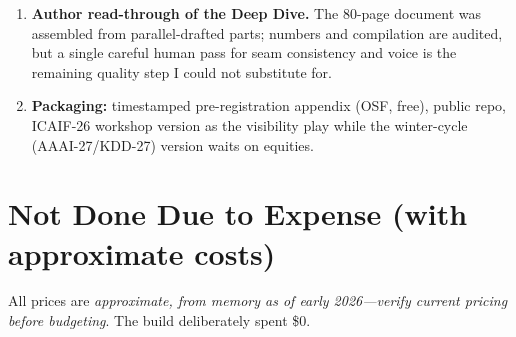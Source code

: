 \documentclass[11pt]{article}
\newcommand{\gate}[1]{\textcolor{red!70!black}{\textbf{[GATE: #1]}}}
\newcommand{\est}[1]{\textcolor{blue!50!black}{\emph{#1}}}
\begin{document}
\begin{enumerate}
  cost of a complexity term); (b) decide the Inv-PnCO coauthor invitation
  \gate{by Jul 1, per roadmap}---it affects framing and theory credibility.
  \item \textbf{Author read-through of the Deep Dive.} The 80-page document was
  assembled from parallel-drafted parts; numbers and compilation are audited, but a
  single careful human pass for seam consistency and voice is the remaining quality
  step I could not substitute for.
  \item \textbf{Packaging:} timestamped pre-registration appendix (OSF, free), public
  repo, ICAIF-26 workshop version as the visibility play while the winter-cycle
  (AAAI-27/KDD-27) version waits on equities.
\end{enumerate}

\section{Not Done Due to Expense (with approximate costs)}
All prices are \est{approximate, from memory as of early 2026---verify current
pricing before budgeting}. The build deliberately spent \$0.
\end{document}
